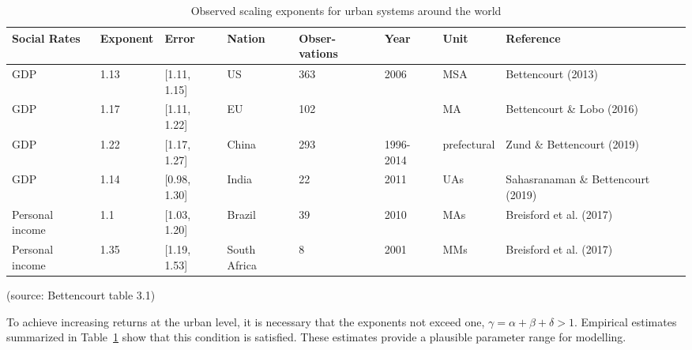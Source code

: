 \begin{table}[htb]\small
\centering
\begin{tabular}{|p{1.5cm}|l|l|p{1.5cm}|p{1.4cm}|p{}|l|p{2.5cm}|}\hline
\textbf{Social Rates} & \textbf{Exponent} & \textbf{Error} & \textbf{Nation} & \textbf{Obser-vations} & \textbf{Year} & \textbf{Unit} & \textbf{Reference} \\ \hline   
GDP             & 1.13 & [1.11, 1.15]  & US           & 363 & 2006        & MSA  & Bettencourt (2013)                 \\ \hline
GDP             & 1.17 & [1.11, 1.22]  & EU           & 102 &             & MA   & Bettencourt  \& Lobo        (2016) \\ \hline
GDP             & 1.22 & [1.17, 1.27]  & China        & 293 & 1996-2014   & prefectural & Zund  \& Bettencourt (2019) \\ \hline
GDP             & 1.14 & [0.98, 1.30]  & India        & 22  & 2011        & UAs  & Sahasranaman \& Bettencourt (2019) \\ \hline
Personal income & 1.1  & [1.03, 1.20]  & Brazil       & 39  & 2010        & MAs  & Breisford et al.  (2017)           \\ \hline
Personal income & 1.35 & [1.19, 1.53]  & South Africa & 8   & 2001        & MMs  & Breisford et al.  (2017)           \\ \hline
\end{tabular}
\caption[Observed scaling exponents]{Observed scaling exponents for urban systems around the world} \label{table-scaling-exponents} (source: Bettencourt \cite{bettencourtIntroductionUrbanScience2021} table 3.1)

\end{table}


To achieve increasing returns at the urban level, it is necessary that the exponents not exceed one, $\gamma=\alpha+ \beta + \delta > 1$.  Empirical estimates summarized in Table~\ref{table-scaling-exponents} show that this condition is satisfied. These estimates provide a plausible parameter range for modelling. 


% 
% 
